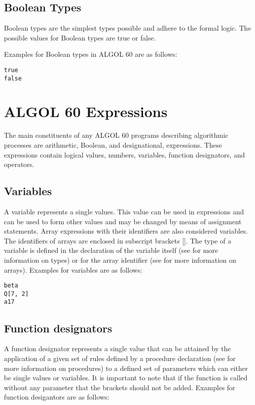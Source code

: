 \documentclass{article}
\begin{document}
\subsection{Boolean Types}
Boolean types are the simplest types possible and adhere to the formal logic. The possible values for Boolean types are true or false.

Examples for Boolean types in ALGOL 60 are as follows:

\begin{lstlisting}[language={[60]algol}]
true
false
\end{lstlisting}

\newpage

\section{ALGOL 60 Expressions}
The main constituents of any ALGOL 60 programs describing algorithmic processes are arithmetic, Boolean, and designational, expressions. These expressions contain logical values, numbers, variables, function designators, and operators.

\subsection{Variables}
A variable represents a single values. This value can be used in expressions and can be used to form other values and may be changed by means of assignment statements. Array expressions with their identifiers are also considered variables. The identifiers of arrays are enclosed in subscript brackets []. The type of a variable is defined in the declaration of the variable itself (see  for more information on types) or for the array identifier (see  for more information on arrays). Examples for variables are as follows:

\begin{lstlisting}[language={[60]algol}]
beta
Q[7, 2]
a17
\end{lstlisting}

\subsection{Function designators}
A function designator represents a single value that can be attained by the application of a given set of rules defined by a procedure declaration (see  for more information on procedures) to a defined set of parameters which can either be single values or variables. It is important to note that if the function is called without any parameter that the brackets should not be added. Examples for function desigantors are as follows:\\
\end{document}
